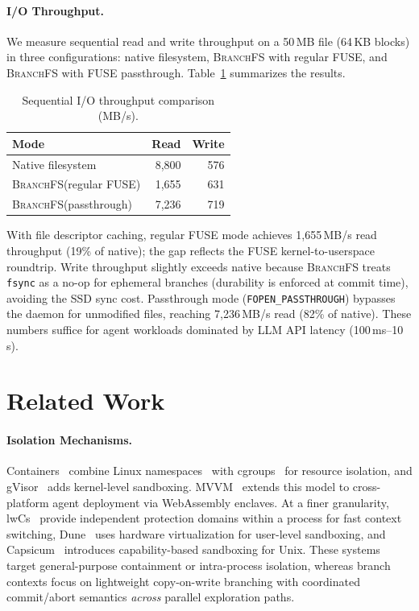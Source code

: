 \documentclass[sigconf]{acmart}
\newcommand{\sys}{\textsc{BranchFS}\xspace}
\begin{document}
\paragraph{I/O Throughput.}
We measure sequential read and write throughput on a 50\,MB file (64\,KB blocks) in three configurations: native filesystem, \sys with regular FUSE, and \sys with FUSE passthrough. Table~\ref{tab:throughput} summarizes the results.

\begin{table}[t]
	\centering
	\caption{Sequential I/O throughput comparison (MB/s).}
	\label{tab:throughput}
	\begin{tabular}{lrr}
		\toprule
		Mode              & Read  & Write \\
		\midrule
		Native filesystem & 8,800 & 576   \\
		\sys (regular FUSE)      & 1,655 & 631   \\
		\sys (passthrough)       & 7,236 & 719   \\
		\bottomrule
	\end{tabular}
\end{table}

With file descriptor caching, regular FUSE mode achieves 1,655\,MB/s read throughput (19\% of native); the gap reflects the FUSE kernel-to-userspace roundtrip. Write throughput slightly exceeds native because \sys treats \texttt{fsync} as a no-op for ephemeral branches (durability is enforced at commit time), avoiding the SSD sync cost. Passthrough mode (\texttt{FOPEN\_PASSTHROUGH}) bypasses the daemon for unmodified files, reaching 7,236\,MB/s read (82\% of native). These numbers suffice for agent workloads dominated by LLM API latency (100\,ms--10\,s).

\section{Related Work}

\paragraph{Isolation Mechanisms.}
Containers~\cite{docker} combine Linux namespaces~\cite{namespaces} with cgroups~\cite{cgroups} for resource isolation, and gVisor~\cite{gvisor} adds kernel-level sandboxing. MVVM~\cite{mvvm} extends this model to cross-platform agent deployment via WebAssembly enclaves. At a finer granularity, lwCs~\cite{lwc} provide independent protection domains within a process for fast context switching, Dune~\cite{dune} uses hardware virtualization for user-level sandboxing, and Capsicum~\cite{capsicum} introduces capability-based sandboxing for Unix. These systems target general-purpose containment or intra-process isolation, whereas branch contexts focus on lightweight copy-on-write branching with coordinated commit/abort semantics \emph{across} parallel exploration paths.
\end{document}

